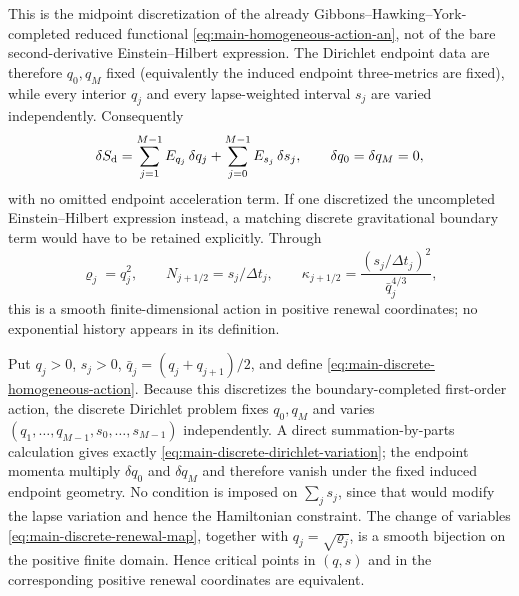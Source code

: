 \documentclass[11pt]{article}
\numberwithin{equation}{section}
\theoremstyle{definition}
\theoremstyle{remark}
\begin{document}
This is the midpoint discretization of the already
Gibbons--Hawking--York-completed reduced functional
\eqref{eq:main-homogeneous-action-an}, not of the bare second-derivative
Einstein--Hilbert expression.  The Dirichlet endpoint data are therefore
$q_0,q_M$ fixed (equivalently the induced endpoint three-metrics are fixed),
while every interior $q_j$ and every lapse-weighted interval $s_j$ are varied
independently.  Consequently
\begin{equation}
 \delta S_{\rm d}
 =\sum_{j=1}^{M-1}E_{q_j}\,\delta q_j
  +\sum_{j=0}^{M-1}E_{s_j}\,\delta s_j,
 \qquad \delta q_0=\delta q_M=0,
 \label{eq:main-discrete-dirichlet-variation}
\end{equation}
with no omitted endpoint acceleration term.  If one discretized the uncompleted
Einstein--Hilbert expression instead, a matching discrete gravitational boundary
term would have to be retained explicitly.  Through
\begin{equation}
 \varrho_j=q_j^2,\qquad
 N_{j+1/2}=s_j/\Delta t_j,\qquad
 \kappa_{j+1/2}=\frac{(s_j/\Delta t_j)^2}{\bar q_j^{4/3}},
 \label{eq:main-discrete-renewal-map}
\end{equation}
this is a smooth finite-dimensional action in positive renewal coordinates; no
exponential history appears in its definition.

Put $q_j>0$, $s_j>0$, $\bar q_j=(q_j+q_{j+1})/2$, and define
\eqref{eq:main-discrete-homogeneous-action}.  Because this discretizes the
boundary-completed first-order action, the discrete Dirichlet problem fixes
$q_0,q_M$ and varies $(q_1,\ldots,q_{M-1},s_0,\ldots,s_{M-1})$ independently.
A direct summation-by-parts calculation gives exactly
\eqref{eq:main-discrete-dirichlet-variation}; the endpoint momenta multiply
$\delta q_0$ and $\delta q_M$ and therefore vanish under the fixed induced
endpoint geometry.  No condition is imposed on $\sum_js_j$, since that would
modify the lapse variation and hence the Hamiltonian constraint.  The change of
variables \eqref{eq:main-discrete-renewal-map}, together with
$q_j=\sqrt{\varrho_j}$, is a smooth bijection on the positive finite domain.
Hence critical points in $(q,s)$ and in the corresponding positive renewal
coordinates are equivalent.
\end{document}
